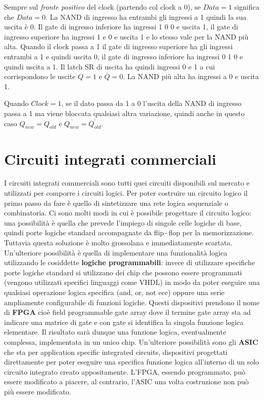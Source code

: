 \documentclass[12pt, a4paper]{report}
\begin{document}
Sempre sul \textit{fronte positivo} del clock (partendo col clock a 0), se $Data = 1$ significa che $\overline{Data} = 0$. La NAND di ingresso ha entrambi gli ingressi a 1 quindi la sua uscita è 0. Il gate di ingresso inferiore ha ingressi 1 0 0 e uscita 1, il gate di ingresso superiore ha ingressi 1 e 0 e uscita 1 e lo stesso vale per la NAND più alta. Quando il clock passa a 1 il gate di ingresso superiore ha gli ingressi entrambi a 1 e quindi uscita 0, il gate di ingresso inferiore ha ingressi 0 1 0 e quindi uscita a 1. Il latch SR di uscita ha quindi ingressi 0 e 1 a cui corrispondono le uscite $Q = 1$ e $\overline{Q} = 0$. La NAND più alta ha ingressi a 0 e uscita 1.

Quando $Clock = 1$, se il dato passa da 1 a 0 l'uscita della NAND di ingresso passa a 1 ma viene bloccata qualsiasi altra variazione, quindi anche in questo caso $Q_{new} = Q_{old}$ e $\overline{Q_{new}} = \overline{Q_{old}}$.

\chapter{Circuiti integrati commerciali}
I circuiti integrati commerciali sono tutti quei circuiti disponibili sul mercato e utilizzati per comporre i circuiti logici. Per poter costruire un circuito logico il primo passo da fare è quello di sintetizzare una rete logica sequenziale o combinatoria. Ci sono molti modi in cui è possibile progettare il circuito logico: una possibilità è quella che prevede l'impiego di singole celle logiche di base, quindi porte logiche standard accompagnate da flip\,-\,flop per la memorizzazione. Tuttavia questa soluzione è molto grossolana e immediatamente scartata. Un'ulteriore possibilità è quella di implementare una funzionalità logica utilizzando le cosiddette \textbf{logiche programmabili}: invece di utilizzare specifiche porte logiche standard si utilizzano dei chip che possono essere programmati (vengono utilizzati specifici linguaggi come VHDL) in modo da poter eseguire una qualsiasi operazione logica specifica (and, or, not ecc) oppure una serie ampliamente configurabile di funzioni logiche. Questi dispositivi prendono il nome di \textbf{FPGA} cioè field programmable gate array dove il termine gate array sta ad indicare una matrice di gate e con gate si identifica la singola funzione logica elementare. Il risultato sarà dunque una funzione logica, eventualmente complessa, implementata in un unico chip. Un'ulteriore possibilità sono gli \textbf{ASIC} che sta per application specific integrated circuits, dispositivi progettati direttamente per poter eseguire una specifica funzione logica all'interno di un solo circuito integrato creato appositamente. L'FPGA, essendo programmato, può essere modificato a piacere, al contrario, l'ASIC una volta costruzione non può più essere modificato.
\end{document}
